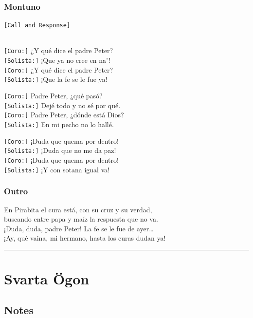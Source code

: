 \subsubsection{Montuno}\label{montuno}

\texttt{{[}Call\ and\ Response{]}}\strut \\
\texttt{{[}Coro:{]}} ¿Y qué dice el padre Peter?\\
\texttt{{[}Solista:{]}} ¡Que ya no cree en na'!\\
\texttt{{[}Coro:{]}} ¿Y qué dice el padre Peter?\\
\texttt{{[}Solista:{]}} ¡Que la fe se le fue ya!

\texttt{{[}Coro:{]}} Padre Peter, ¿qué pasó?\\
\texttt{{[}Solista:{]}} Dejé todo y no sé por qué.\\
\texttt{{[}Coro:{]}} Padre Peter, ¿dónde está Dios?\\
\texttt{{[}Solista:{]}} En mi pecho no lo hallé.

\texttt{{[}Coro:{]}} ¡Duda que quema por dentro!\\
\texttt{{[}Solista:{]}} ¡Duda que no me da paz!\\
\texttt{{[}Coro:{]}} ¡Duda que quema por dentro!\\
\texttt{{[}Solista:{]}} ¡Y con sotana igual va!

\subsubsection{Outro}\label{outro-7}

En Pirabita el cura está, con su cruz y su verdad,\\
buscando entre papa y maíz la respuesta que no va.\\
¡Duda, duda, padre Peter! La fe se le fue de ayer\ldots{}\\
¡Ay, qué vaina, mi hermano, hasta los curas dudan ya!

\begin{center}\rule{0.5\linewidth}{0.5pt}\end{center}

\section{Svarta Ögon}\label{svarta-uxf6gon}

\subsection{Notes}\label{notes-24}

